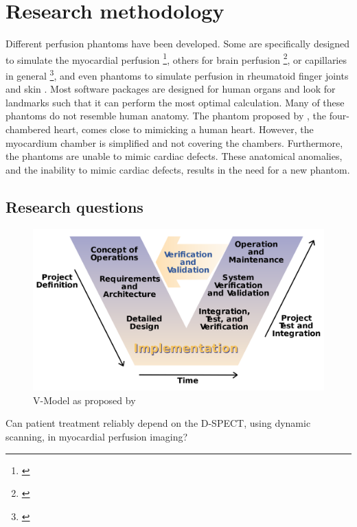 \chapter{Research methodology}
\label{ch:res_metho}

Different perfusion phantoms have been developed. Some are specifically designed to simulate the myocardial perfusion \footnote{\citep{chiribiri2013perfusion, otton2013direct, o2017effect, o2017feasibility, teslow1991x}}, others for brain perfusion \footnote{\citep{hashimoto2018effect, suzuki2017quantitative, boese2013performance, mathys2012phantom, ebrahimi2010microfabricated, wang2010flow, noguchi2007quantitative, ganguly2012vitro, klotz1999perfusion}}, or capillaries in general \footnote{\citep{kim2016efficiency, anderson2011semipermeable, driscoll2011development, gauthier2011perfusion, veltmann2002design, lohmaier2004vitro}}, and even phantoms to simulate perfusion in rheumatoid finger joints \citep{sakano2015power} and skin \citep{kim2018multidimensional}. Most software packages are designed for human organs and look for landmarks such that it can perform the most optimal calculation. Many of these phantoms do not resemble human anatomy. The phantom proposed by \cite{chiribiri2013perfusion}, the four-chambered heart, comes close to mimicking a human heart. However, the myocardium chamber is simplified and not covering the chambers. Furthermore, the phantoms are unable to mimic cardiac defects. These anatomical anomalies, and the inability to mimic cardiac defects,  results in the need for a new phantom.

\section{Research questions}
\begin{figure}[b!]
	\begin{center}
		\includegraphics[width=0.5\linewidth]{images/vmodel.png}
	\end{center}
	\caption{V-Model\citep{rook1986controlling} as proposed by \cite{osborne2005clarus}}
	\label{fig:vmodel}
\end{figure}
Can patient treatment reliably depend on the D-SPECT, using dynamic scanning, in myocardial perfusion imaging?

